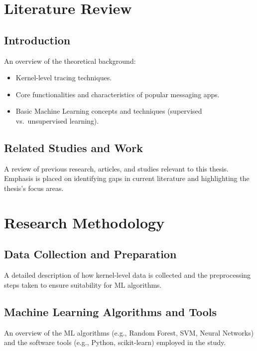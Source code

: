 \documentclass[a4paper,12pt]{report}
\begin{document}
\chapter{Literature Review}

\section{Introduction}
An overview of the theoretical background:
\begin{itemize}
    \item Kernel-level tracing techniques.
    \item Core functionalities and characteristics of popular messaging apps.
    \item Basic Machine Learning concepts and techniques (supervised vs.\ unsupervised learning).
\end{itemize}

\section{Related Studies and Work}
A review of previous research, articles, and studies relevant to this thesis. Emphasis is placed on identifying gaps in current literature and highlighting the thesis’s focus areas.

\chapter{Research Methodology}

\section{Data Collection and Preparation}
A detailed description of how kernel-level data is collected and the preprocessing steps taken to ensure suitability for ML algorithms.

\section{Machine Learning Algorithms and Tools}
An overview of the ML algorithms (e.g., Random Forest, SVM, Neural Networks) and the software tools (e.g., Python, scikit-learn) employed in the study.
\end{document}
